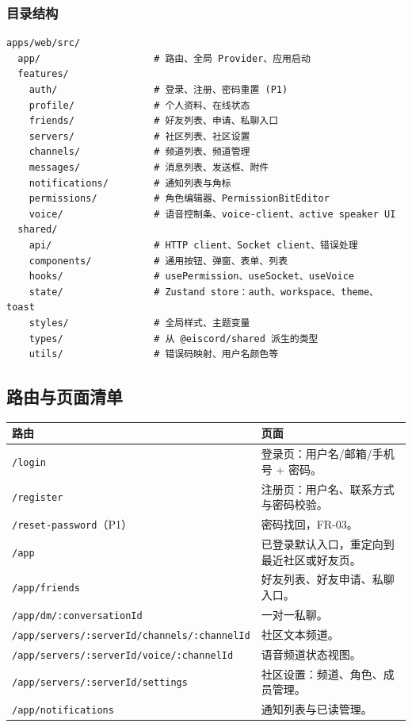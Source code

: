 \subsubsection{目录结构}

\begin{verbatim}
apps/web/src/
  app/                    # 路由、全局 Provider、应用启动
  features/
    auth/                 # 登录、注册、密码重置 (P1)
    profile/              # 个人资料、在线状态
    friends/              # 好友列表、申请、私聊入口
    servers/              # 社区列表、社区设置
    channels/             # 频道列表、频道管理
    messages/             # 消息列表、发送框、附件
    notifications/        # 通知列表与角标
    permissions/          # 角色编辑器、PermissionBitEditor
    voice/                # 语音控制条、voice-client、active speaker UI
  shared/
    api/                  # HTTP client、Socket client、错误处理
    components/           # 通用按钮、弹窗、表单、列表
    hooks/                # usePermission、useSocket、useVoice
    state/                # Zustand store：auth、workspace、theme、toast
    styles/               # 全局样式、主题变量
    types/                # 从 @eiscord/shared 派生的类型
    utils/                # 错误码映射、用户名颜色等
\end{verbatim}

\subsection{路由与页面清单}

\noindent\begin{tabularx}{\textwidth}{L{6.4cm}Y}
  \toprule
  路由 & 页面 \\
  \midrule
  \texttt{/login} & 登录页：用户名/邮箱/手机号 + 密码。 \\
  \texttt{/register} & 注册页：用户名、联系方式与密码校验。 \\
  \texttt{/reset-password}（P1） & 密码找回，FR-03。 \\
  \texttt{/app} & 已登录默认入口，重定向到最近社区或好友页。 \\
  \texttt{/app/friends} & 好友列表、好友申请、私聊入口。 \\
  \texttt{/app/dm/:conversationId} & 一对一私聊。 \\
  \texttt{/app/servers/:serverId/channels/:channelId} & 社区文本频道。 \\
  \texttt{/app/servers/:serverId/voice/:channelId} & 语音频道状态视图。 \\
  \texttt{/app/servers/:serverId/settings} & 社区设置：频道、角色、成员管理。 \\
  \texttt{/app/notifications} & 通知列表与已读管理。 \\
  \bottomrule
\end{tabularx}

